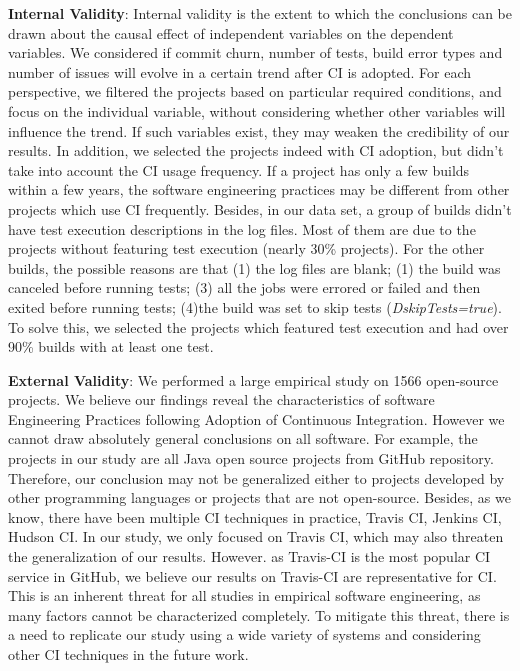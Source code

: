 \textbf{Internal Validity}:
Internal validity is the extent to which the conclusions can be drawn about the causal effect of independent variables on the dependent variables. We considered if commit churn, number of tests, build error types and number of issues will evolve in a certain trend after CI is adopted. For each perspective, we filtered the projects based on particular required conditions, and focus on the individual variable, without considering whether other variables will influence the trend. If such variables exist, they may weaken the credibility of our results.
In addition, we selected the projects indeed with CI adoption, but didn't take into account the CI usage frequency. If a project has only a few builds within a few years, the software engineering practices may be different from other projects which use CI frequently. 
Besides, in our data set, a group of builds didn't have test execution descriptions in the log files. Most of them are due to the projects without featuring test execution (nearly 30\% projects). For the other builds, the possible reasons are that (1) the log files are blank; (1) the build was canceled before running tests; (3) all the jobs were errored or failed and then exited before running tests; (4)the build was set to skip tests (\eg \textit{DskipTests=true}). To solve this, we selected the projects which featured test execution and had over 90\% builds with at least one test.


\textbf{External Validity}: We performed a large empirical study on 1566 open-source projects. We believe our findings reveal the characteristics of software Engineering Practices following Adoption of Continuous Integration. However we cannot draw absolutely general conclusions on all software.
For example, the projects in our study are all Java open source projects from GitHub repository. Therefore, our conclusion may not be generalized either to projects developed by other programming languages or projects that are not open-source. Besides, as we know, there have been multiple CI techniques in practice, \eg Travis CI, Jenkins CI, Hudson CI. In our study, we only focused on Travis CI, which may also threaten the generalization of our results. However. as Travis-CI is the most popular CI service in GitHub, we believe our results on Travis-CI are representative for CI.  This is an inherent threat for all studies in empirical software engineering, as many factors cannot be characterized completely. To mitigate this threat, there is a need to replicate our study using a wide variety of systems and considering other CI techniques in the future work.

